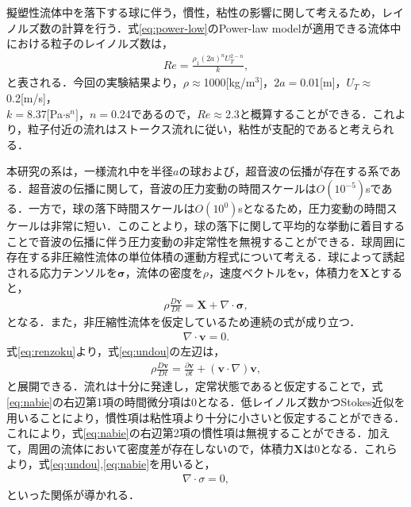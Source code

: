 擬塑性流体中を落下する球に伴う，慣性，粘性の影響に関して考えるため，レイノルズ数の計算を行う．式\ref{eq:power-low}のPower-law modelが適用できる流体中における粒子のレイノルズ数は，
\begin{eqnarray}
    Re = \frac{\rho_1 \left(2a\right)^n U_T^{2-n}}{k} ,
\end{eqnarray}
と表される\cite{ref:1,ref:8-5}．今回の実験結果より，$\rho \approx$1000[kg/m${}^3$]，$2a =$0.01[m]，$U_T \approx$0.2[m/s]，\\$k =$8.37[Pa$\cdot \text{s}^n]$，$n =$0.24であるので，$Re \approx$2.3と概算することができる．これより，粒子付近の流れはストークス流れに従い，粘性が支配的であると考えられる．

本研究の系は，一様流れ中を半径$a$の球および，超音波の伝播が存在する系である．超音波の伝播に関して，音波の圧力変動の時間スケールは$O\left(10^{-5}\right)$sである．一方で，球の落下時間スケールは$O\left(10^{0}\right)$sとなるため，圧力変動の時間スケールは非常に短い．このことより，球の落下に関して平均的な挙動に着目することで音波の伝播に伴う圧力変動の非定常性を無視することができる．球周囲に存在する非圧縮性流体の単位体積の運動方程式について考える．球によって誘起される応力テンソルを$\bm{\sigma}$，流体の密度を$\rho$，速度ベクトルを$\bm{v}$，体積力を$\bm{X}$とすると，
\begin{eqnarray}
    \rho \frac{D\bm{v}}{Dt} = \bm{X} + \nabla \cdot \bm{\sigma} ,
    \label{eq:undou}
\end{eqnarray}
となる．また，非圧縮性流体を仮定しているため連続の式が成り立つ．
\begin{eqnarray}
    \nabla \cdot \bm{v} = 0 .
    \label{eq:renzoku}
\end{eqnarray}
式\ref{eq:renzoku}より，式\ref{eq:undou}の左辺は，
\begin{eqnarray}
    \rho \frac{D\bm{v}}{Dt} = \frac{\partial \bm{v}}{\partial t} + \left(\bm{v} \cdot \nabla \right) \bm{v} ,
    \label{eq:nabie}
\end{eqnarray}
と展開できる．流れは十分に発達し，定常状態であると仮定することで，式\ref{eq:nabie}の右辺第1項の時間微分項は0となる．低レイノルズ数かつStokes近似を用いることにより，慣性項は粘性項より十分に小さいと仮定することができる．これにより，式\ref{eq:nabie}の右辺第2項の慣性項は無視することができる．加えて，周囲の流体において密度差が存在しないので，体積力$\bm{X}$は0となる．これらより，式\ref{eq:undou},\ref{eq:nabie}を用いると，
\begin{eqnarray}
    \nabla \cdot \sigma = 0 ,
    \label{eq:sigma-}
\end{eqnarray}
といった関係が導かれる．

